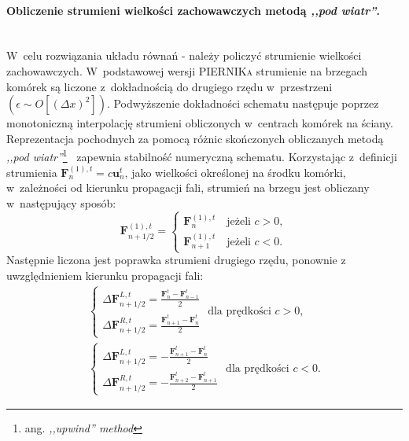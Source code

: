 \paragraph{Obliczenie strumieni wielkości zachowawczych metodą \emph{,,pod wiatr''}.}~\\
%
W~celu rozwiązania układu równań - należy policzyć strumienie
wielkości zachowawczych. W~podstawowej wersji \textsc{PIERNIKa} strumienie
na brzegach komórek są liczone z~dokładnością do drugiego rzędu w~przestrzeni
$\left(\epsilon \sim O\left[(\Delta x)^2\right]\right)$. 
Podwyższenie dokładności schematu następuje poprzez monotoniczną interpolację
strumieni obliczonych w~centrach komórek na ściany. Reprezentacja pochodnych za
pomocą różnic skończonych obliczanych metodą \emph{,,pod wiatr''}\footnote{ang.
\emph{,,upwind'' method}}~\cite{cir} zapewnia stabilność numeryczną schematu.
Korzystając z~definicji strumienia $\mathbf{F}_n^{(1),t}=c \mathbf{u}_n^t$, jako
wielkości określonej na środku komórki, w~zależności od kierunku propagacji
fali, strumień na brzegu jest obliczany w~następujący sposób:
%
\begin{equation}
   \mathbf{F}^{(1),t}_{n+1/2} = 
   \begin{cases}
      \mathbf{F}^{(1),t}_{n}  \quad \textrm{jeżeli }c>0,\\
      \mathbf{F}^{(1),t}_{n+1}\quad \textrm{jeżeli }c<0.
   \end{cases}
\end{equation}
%
Następnie liczona jest poprawka strumieni drugiego rzędu, ponownie z
uwzględnieniem kierunku propagacji fali:
%
\begin{align} \label{lab1}
   \begin{cases} 
      \Delta \mathbf{F}^{L,t}_{n+1/2} = \frac{\mathbf{F}^t_{n} - \mathbf{F}^t_{n-1}}{2} \\
      \Delta \mathbf{F}^{R,t}_{n+1/2} = \frac{\mathbf{F}^t_{n+1} - \mathbf{F}^t_{n}}{2}
   \end{cases} \textrm{ dla prędkości }c>0,\\
   \label{lab2}\begin{cases} 
   \Delta \mathbf{F}^{L,t}_{n+1/2} = -\frac{\mathbf{F}^t_{n+1} - \mathbf{F}^t_{n}}{2} \\
   \Delta \mathbf{F}^{R,t}_{n+1/2} = -\frac{\mathbf{F}^t_{n+2} - \mathbf{F}^t_{n+1}}{2}
   \end{cases} \textrm{ dla prędkości }c<0.
\end{align}

